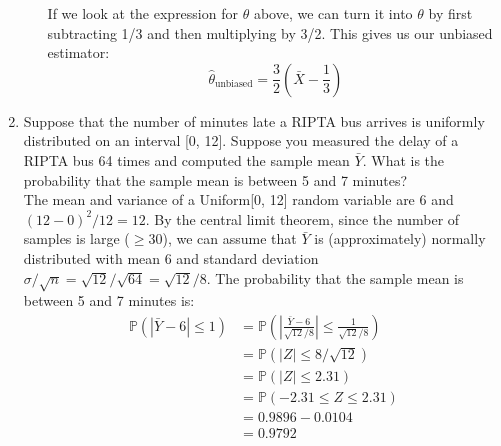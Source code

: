 \documentclass[12pt]{article}
\def\P{{\mathbb P}}
\begin{document}
\begin{enumerate}
\begin{enumerate}
If we look at the expression for $\mathbb{\theta}$ above, we can turn it into $\theta$ by first subtracting 1/3 and then multiplying by 3/2. This gives us our unbiased estimator:
\[
\hat{\theta}_{\mbox{unbiased}} = \frac{3}{2} \left( \bar{X} - \frac{1}{3} \right)
\]
\end{enumerate}

\item Suppose that the number of minutes late a RIPTA bus arrives is uniformly distributed on an interval [0, 12]. Suppose you measured the delay of a RIPTA bus 64 times and computed the sample mean $\bar{Y}$. What is the probability that the sample mean is between 5 and 7 minutes?\\

The mean and variance of a Uniform[0, 12] random variable are 6 and $(12 - 0)^2 / 12 = 12$. By the central limit theorem, since the number of samples is large ($\geq 30$), we can assume that $\bar{Y}$ is (approximately) normally distributed with mean 6 and standard deviation $\sigma / \sqrt{n} = \sqrt{12} / \sqrt{64} = \sqrt{12} / {8}$. The probability that the sample mean is between 5 and 7 minutes is:
\begin{align*}
\P(|\bar{Y} - 6| \leq 1) &= \P \left( \left| \frac{\bar{Y} - 6}{\sqrt{12} / {8}} \right| \leq \frac{1}{\sqrt{12} / {8}} \right) \\
&= \P(|Z| \leq 8 / \sqrt{12} ) \\
&= \P(|Z| \leq 2.31 ) \\
&= \P( -2.31 \leq Z \leq 2.31 ) \\
&= 0.9896 - 0.0104 \\
&= 0.9792
\end{align*}

\end{enumerate}
\end{document}
